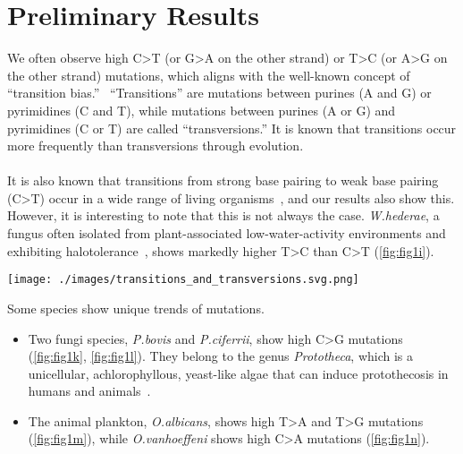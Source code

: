 \documentclass{article}
\begin{document}
\section{Preliminary Results}
\begin{itemize}
\begin{minipage}{0.55\textwidth}
  \item We often observe high C>T (or G>A on the other strand) or T>C (or A>G on the other strand) mutations, which aligns with the well-known concept of “transition bias.”~\cite{macintyre1985molecular} “Transitions” are mutations between purines (A and G) or pyrimidines (C and T), while mutations between purines (A or G) and pyrimidines (C or T) are called “transversions.” It is known that transitions occur more frequently than transversions through evolution.~\cite{macintyre1985molecular}\\\\
    It is also known that transitions from strong base pairing to weak base pairing (C>T) occur in a wide range of living organisms~\cite{gheorghiu2020influence}, and our results also show this. However, it is interesting to note that this is not always the case. \textit{W.hederae}, a fungus often isolated from plant-associated low-water-activity environments and exhibiting halotolerance~\cite{janvcivc2016halophily}, shows markedly higher T>C than C>T (\autoref{fig:fig1i}).
\end{minipage}\hfill
  \begin{minipage}{0.3\textwidth}
    \texttt{[image: ./images/transitions\_and\_transversions.svg.png]}
    \label{fig:fig0}
\end{minipage}
  \item Some species show unique trends of mutations.
    \begin{itemize}
    \item Two fungi species, \textit{P.bovis} and \textit{P.ciferrii}, show high C>G mutations (\autoref{fig:fig1k}, \ref{fig:fig1l}). They belong to the genus \textit{Prototheca}, which is a unicellular, achlorophyllous, yeast-like algae that can induce protothecosis in humans and animals~\cite{hifney2022microbial}.
      \item The animal plankton, \textit{O.albicans}, shows high T>A and T>G mutations (\autoref{fig:fig1m}), while \textit{O.vanhoeffeni} shows high C>A mutations (\autoref{fig:fig1n}).
    \end{itemize}
\end{itemize}
\end{document}
